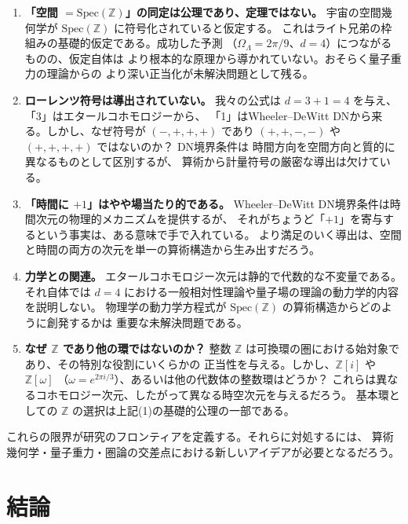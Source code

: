 \documentclass[12pt,a4paper]{article}
\theoremstyle{definition}
\newcommand{\Spec}{\mathrm{Spec}}
\newcommand{\ZZ}{\mathbb{Z}}
\begin{document}
\begin{enumerate}
  \item \textbf{「空間 $= \Spec(\ZZ)$」の同定は公理であり、定理ではない。}
    宇宙の空間幾何学が $\Spec(\ZZ)$ に符号化されていると仮定する。
    これはライト兄弟の枠組みの基礎的仮定である。成功した予測
    （$\Omega_\Lambda = 2\pi/9$、$d=4$）につながるものの、仮定自体は
    より根本的な原理から導かれていない。おそらく量子重力の理論からの
    より深い正当化が未解決問題として残る。

  \item \textbf{ローレンツ符号は導出されていない。}
    我々の公式は $d = 3 + 1 = 4$ を与え、「3」はエタールコホモロジーから、
    「1」はWheeler--DeWitt DNから来る。しかし、なぜ符号が $(-, +, +, +)$ であり
    $(+, +, -, -)$ や $(+, +, +, +)$ ではないのか？ DN境界条件は
    時間方向を空間方向と質的に異なるものとして区別するが、
    算術から計量符号の厳密な導出は欠けている。

  \item \textbf{「時間に $+1$」はやや場当たり的である。}
    Wheeler--DeWitt DN境界条件は時間次元の物理的メカニズムを提供するが、
    それがちょうど「$+1$」を寄与するという事実は、ある意味で手で入れている。
    より満足のいく導出は、空間と時間の両方の次元を単一の算術構造から生み出すだろう。

  \item \textbf{力学との関連。}
    エタールコホモロジー次元は静的で代数的な不変量である。それ自体では
    $d=4$ における一般相対性理論や量子場の理論の動力学的内容を説明しない。
    物理学の動力学方程式が $\Spec(\ZZ)$ の算術構造からどのように創発するかは
    重要な未解決問題である。

  \item \textbf{なぜ $\ZZ$ であり他の環ではないのか？}
    整数 $\ZZ$ は可換環の圏における始対象であり、その特別な役割にいくらかの
    正当性を与える。しかし、$\ZZ[i]$ や $\ZZ[\omega]$
    （$\omega = e^{2\pi i/3}$）、あるいは他の代数体の整数環はどうか？
    これらは異なるコホモロジー次元、したがって異なる時空次元を与えるだろう。
    基本環としての $\ZZ$ の選択は上記(1)の基礎的公理の一部である。
\end{enumerate}

これらの限界が研究のフロンティアを定義する。それらに対処するには、
算術幾何学・量子重力・圏論の交差点における新しいアイデアが必要となるだろう。

\section{結論}\label{sec:conclusion}
\end{document}

